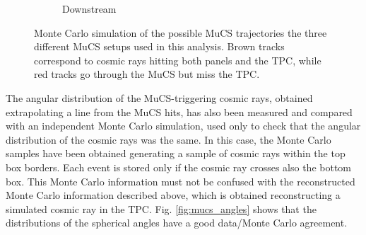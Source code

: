 \documentclass[a4paper]{scrartcl}
\begin{document}
\begin{figure}[htbp]
\begin{subfigure}{0.32\textwidth}
    \caption{Downstream} \label{fig:downstream_align}
  \end{subfigure}

  \caption{Monte Carlo simulation of the possible MuCS trajectories the three different MuCS setups used in this analysis. Brown tracks correspond to cosmic rays hitting both panels and the TPC, while red tracks go through the MuCS but miss the TPC.} \label{fig:alignment}
\end{figure}

The angular distribution of the MuCS-triggering cosmic rays, obtained extrapolating a line from the MuCS hits, has also been measured and compared with an independent Monte Carlo simulation, used only to check that the angular distribution of the cosmic rays was the same.  In this case, the Monte Carlo samples have been obtained generating a sample of cosmic rays within the top box borders. Each event is stored only if the cosmic ray crosses also the bottom box. This Monte Carlo information must not be confused with the reconstructed Monte Carlo information described above, which is obtained reconstructing a simulated cosmic ray in the TPC. Fig. \ref{fig:mucs_angles} shows that the distributions of the spherical angles have a good data/Monte Carlo agreement.
\end{document}
